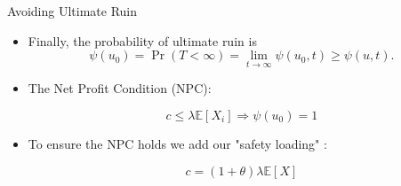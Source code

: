 \documentclass[11pt]{beamer}
\newcommand{\expect}{\mathbb{E}}
\begin{document}
\begin{frame}{Avoiding Ultimate Ruin}

\begin{itemize}

\item Finally, the probability of \alert{ultimate} ruin is
$$\psi(u_0) =\Pr(T<\infty)= \lim_{t\rightarrow \infty} \psi(u_0,t) \ge \psi(u,t).$$

\vfill

\item The Net Profit Condition (NPC):

\begin{equation*}\label{Def:NPC}
c \leq \lambda \expect[X_i] \Rightarrow \psi(u_0)=1
\end{equation*} 
\vfill
\item To ensure the NPC holds we add our "safety loading" : 

\begin{equation*}
c=(1+\theta)\lambda \expect[X]
\end{equation*}
\end{itemize}

\end{frame}
\end{document}
